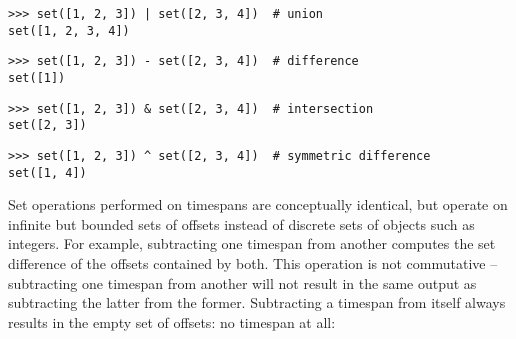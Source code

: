 \begin{comment}
<abjad>
set([1, 2, 3]) | set([2, 3, 4])  # union
set([1, 2, 3]) - set([2, 3, 4])  # difference
set([1, 2, 3]) & set([2, 3, 4])  # intersection
set([1, 2, 3]) ^ set([2, 3, 4])  # symmetric difference
</abjad>
\end{comment}

\begin{abjadbookoutput}
\begin{singlespacing}
\vspace{-0.5\baselineskip}
\begin{lstlisting}
>>> set([1, 2, 3]) | set([2, 3, 4])  # union
set([1, 2, 3, 4])
\end{lstlisting}
\begin{lstlisting}
>>> set([1, 2, 3]) - set([2, 3, 4])  # difference
set([1])
\end{lstlisting}
\begin{lstlisting}
>>> set([1, 2, 3]) & set([2, 3, 4])  # intersection
set([2, 3])
\end{lstlisting}
\begin{lstlisting}
>>> set([1, 2, 3]) ^ set([2, 3, 4])  # symmetric difference
set([1, 4])
\end{lstlisting}
\end{singlespacing}
\end{abjadbookoutput}

\noindent Set operations performed on timespans are conceptually identical, but
operate on infinite but bounded sets of offsets instead of discrete sets of
objects such as integers. For example, subtracting one timespan from another
computes the set difference of the offsets contained by both. This operation is
not commutative -- subtracting one timespan from another will not result in the
same output as subtracting the latter from the former. Subtracting a timespan
from itself always results in the empty set of offsets: no timespan at all:

\begin{comment}
<abjad>
result = timespantools.Timespan(0, 10) - timespantools.Timespan(0, 10)
print(format(result))
result = timespantools.Timespan(0, 10) - timespantools.Timespan(5, 15)
print(format(result))
result = timespantools.Timespan(0, 10) - timespantools.Timespan(10, 20)
print(format(result))
result = timespantools.Timespan(5, 15) - timespantools.Timespan(0, 10)
print(format(result))
result = timespantools.Timespan(5, 15) - timespantools.Timespan(5, 15)
print(format(result))
result = timespantools.Timespan(5, 15) - timespantools.Timespan(10, 20)
print(format(result))
result = timespantools.Timespan(10, 20) - timespantools.Timespan(0, 10)
print(format(result))
result = timespantools.Timespan(10, 20) - timespantools.Timespan(5, 15)
print(format(result))
result = timespantools.Timespan(10, 20) - timespantools.Timespan(10, 20)
print(format(result))
</abjad>
\end{comment}

